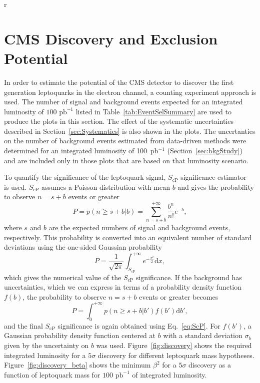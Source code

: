 r%
%

\section{CMS Discovery and Exclusion Potential} \label{CMSpotential}

In order to estimate the potential of the CMS detector to discover the first generation leptoquarks
in the electron channel, a counting experiment approach is used. 
The number of signal and background events expected for an integrated luminosity of
$100\text{ pb}^{-1}$ listed in Table~\ref{tab:EventSelSummary} 
are used to produce the plots in this section.
The effect of the systematic uncertainties described in Section~\ref{sec:Systematics} is also shown in the plots. 
The uncertanties on the number of background events estimated from data-driven methods were determined for 
an integrated luminosity of 100~pb$^{-1}$
(Section~\ref{sec:bkgStudy}) and are included only in those plots that are based on that luminosity scenario.  


To quantify the significance of the
leptoquark signal, $S_\text{cP}$ significance estimator~\cite{Bityukov:2005hg} is used. $S_\text{cP}$ assumes a Poisson distribution
with mean $b$ and gives the probability to observe $n=s+b$ events or greater
\begin{equation}
P = p(n\geq s+b|b) = \sum_{n=s+b}^{+\infty} \frac{b^n}{n!}e^{-b},
\end{equation}
where $s$ and $b$ are the expected numbers of signal and background events, respectively. This probability is 
converted into an equivalent number of standard deviations using the one-sided Gaussian probability
\begin{equation}
P = \frac{1}{\sqrt{2\pi}}\int_{S_\text{cP}}^{+\infty} e^{-\frac{x^2}{2}}\mathrm{d}x,
\label{eq:ScP}
\end{equation}
which gives the numerical value of the $S_\text{cP}$ significance. If the background has uncertainties, which we can express in terms of
a probability density function $f(b)$, the probability to observe $n=s+b$ events or greater becomes
\begin{equation}
P = \int_0^{+\infty} p(n\geq s+b|b')f(b')\mathrm{d}b',
\end{equation}
and the final $S_\text{cP}$ significance is again obtained using Eq.~\ref{eq:ScP}. For $f(b')$, a Gaussian probability density function
centered at $b$ with a standard deviation $\sigma_b$ given by the uncertainty on $b$ was used. 
Figure~\ref{fig:discovery} shows the required integrated luminosity for a $5\sigma$ discovery for different leptoquark mass hypotheses. 
Figure~\ref{fig:discovery_beta} shows the minimum $\beta^2$ for a $5\sigma$ discovery as a function of leptoquark mass for $100\text{ pb}^{-1}$ 
of integrated luminosity.

